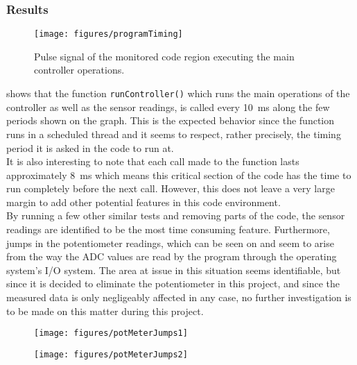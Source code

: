 \subsubsection{Results}
\begin{figure}[H]
  \centering
  \texttt{[image: figures/programTiming]}
  \caption{Pulse signal of the monitored code region executing the main controller operations.}
  \label{fig:programTiming}
\end{figure}
 shows that the function \lstinline{runController()} which runs the main operations of the controller as well as the sensor readings, is called every \SI{10}{ms} along the few periods shown on the graph. This is the expected behavior since the function runs in a scheduled thread and it seems to respect, rather precisely, the timing period it is asked in the code to run at.\\
It is also interesting to note that each call made to the function lasts approximately \SI{8}{ms} which means this critical section of the code has the time to run completely before the next call. However, this does not leave a very large margin to add other potential features in this code environment.\\
By running a few other similar tests and removing parts of the code, the sensor readings are identified to be the most time consuming feature. Furthermore, jumps in the potentiometer readings, which can be seen on  and  seem to arise from the way the ADC values are read by the program through the operating system's I/O system. The area at issue in this situation seems identifiable, but since it is decided to eliminate the potentiometer in this project, and since the measured data is only negligeably affected in any case, no further investigation is to be made on this matter during this project.

\begin{minipage}{0.45\linewidth}
  \begin{figure}[H]
    \texttt{[image: figures/potMeterJumps1]}
    \captionsetup{justification=centering}
    \label{fig:potMeterJumps1}
  \end{figure}\vspace{-5mm}
\end{minipage}
\hspace{0.03\linewidth}
\begin{minipage}{0.45\linewidth}
  \begin{figure}[H]\vspace{-4mm}
    \texttt{[image: figures/potMeterJumps2]}
    \captionsetup{justification=centering}
    \label{fig:potMeterJumps2}
  \end{figure}\vspace{-5mm}
\end{minipage}